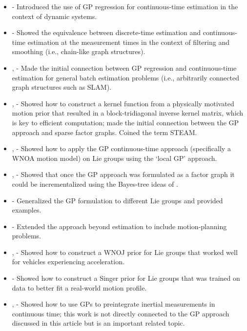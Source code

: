 \begin{itemize}
\item \citet{rasmussen06} - Introduced the use of \ac{GP} regression for continuous-time estimation in the context of dynamic systems.
\item \citet{sarkka06} - Showed the equivalence between discrete-time estimation and continuous-time estimation at the measurement times in the context of filtering and smoothing (i.e., chain-like graph structures).
\item \citet{tong_crv12}, \citet{tong_ijrr13b} - Made the initial connection between \ac{GP} regression and continuous-time estimation for general batch estimation problems (i.e., arbitrarily connected graph structures such as \ac{SLAM}).
\item \citet{barfoot_rss14}, \citet{anderson_ar15} - Showed how to construct a kernel function from a physically motivated motion prior that resulted in a block-tridiagonal inverse kernel matrix, which is key to efficient computation; made the initial connection between the \ac{GP} approach and sparse factor graphs.  Coined the term \ac{STEAM}.
\item \citet{anderson_iros15}, \citet{anderson_phd16} - Showed how to apply the \ac{GP} continuous-time approach (specifically a \ac{WNOA} motion model) on Lie groups using the `local GP' approach.
\item \citet{yanIncrementalSparseGP2015}, \citet{yanIncrementalSparseGP2017} - Showed that once the \ac{GP} approach was formulated as a factor graph it could be incrementalized using the Bayes-tree ideas of \citet{kaess08, kaessISAM2IncrementalSmoothing2012}.
\item \citet{dongSparseGaussianProcesses2018} - Generalized the \ac{GP} formulation to different Lie groups and provided examples.
\item \citet{mukadamContinuoustimeGaussianProcess2018} - Extended the approach beyond estimation to include motion-planning problems.
\item \citet{tang_ral19}, \citet{nguyen_tro25} - Showed how to construct a \ac{WNOJ} prior for Lie groups that worked well for vehicles experiencing acceleration.
\item \citet{wong_ral20} - Showed how to construct a Singer prior for Lie groups that was trained on data to better fit a real-world motion profile.
\item \citet{legentilGaussianProcessPreintegration2020}, \citet{legentilContinuousLatentState2023} - Showed how to use \acp{GP} to preintegrate inertial measurements in continuous time; this work is not directly connected to the \ac{GP} approach discussed in this article but is an important related topic.

\end{itemize}
